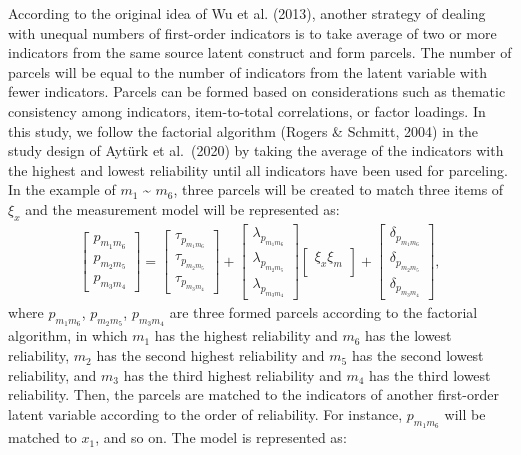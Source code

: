 \documentclass[
  man]{apa6}
\begin{document}
According to the original idea of Wu et al. (2013), another strategy of dealing with unequal numbers of first-order indicators is to take average of two or more indicators from the same source latent construct and form parcels. The number of parcels will be equal to the number of indicators from the latent variable with fewer indicators. Parcels can be formed based on considerations such as thematic consistency among indicators, item-to-total correlations, or factor loadings. In this study, we follow the factorial algorithm (Rogers \& Schmitt, 2004) in the study design of Aytürk et al.~(2020) by taking the average of the indicators with the highest and lowest reliability until all indicators have been used for parceling. In the example of \(m_{1}\) \textasciitilde{} \(m_{6}\), three parcels will be created to match three items of \(\xi_{x}\) and the measurement model will be represented as:
\begin{align}
    \begin{bmatrix}
        p_{m_{1}m_{6}} \\
        p_{m_{2}m_{5}} \\ 
        p_{m_{3}m_{4}}
    \end{bmatrix} =
    \begin{bmatrix}
        \tau_{p_{m_{1}m_{6}}} \\
        \tau_{p_{m_{2}m_{5}}} \\ 
        \tau_{p_{m_{3}m_{4}}}
    \end{bmatrix} +
    \begin{bmatrix}
        \lambda_{p_{m_{1}m_{6}}} \\
        \lambda_{p_{m_{2}m_{5}}} \\ 
        \lambda_{p_{m_{3}m_{4}}}
    \end{bmatrix}
    \begin{bmatrix}
        \xi_{x}\xi_{m} \\
    \end{bmatrix} +
    \begin{bmatrix}
        \delta_{p_{m_{1}m_{6}}} \\
        \delta_{p_{m_{2}m_{5}}} \\ 
        \delta_{p_{m_{3}m_{4}}}
    \end{bmatrix},
\end{align}
where \(p_{m_{1}m_{6}}\), \(p_{m_{2}m_{5}}\), \(p_{m_{3}m_{4}}\) are three formed parcels according to the factorial algorithm, in which \(m_{1}\) has the highest reliability and \(m_{6}\) has the lowest reliability, \(m_{2}\) has the second highest reliability and \(m_{5}\) has the second lowest reliability, and \(m_{3}\) has the third highest reliability and \(m_{4}\) has the third lowest reliability. Then, the parcels are matched to the indicators of another first-order latent variable according to the order of reliability. For instance, \(p_{m_{1}m_{6}}\) will be matched to \(x_{1}\), and so on. The model is represented as:
\end{document}
